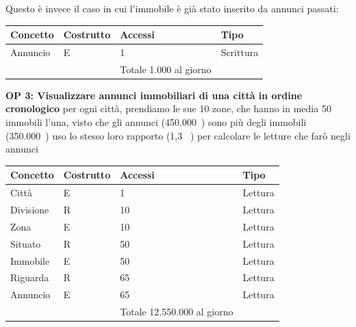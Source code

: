\documentclass[a4paper,12pt]{report}
\begin{document}
            Questo è invece il caso in cui l'immobile è già stato inserito da annunci passati:
            
        	\begin{table}[H]
            \centering
             \begin{tabular}{||l l l l||}
             \hline
             Concetto & Costrutto & Accessi & Tipo \\ [0.5ex] 
             \hline\hline
             Annuncio & E & 1 & Scrittura \\ 
             \hline
                &   & Totale  1.000 al giorno &  \\ [1ex] 
             \hline
             \end{tabular}
            \end{table}

            \textbf{OP 3: Visualizzare annunci immobiliari di una città in ordine cronologico}
            per ogni città, prendiamo le sue 10 zone, che hanno in media 50 immobili l'una, visto che gli annunci (450.000~) sono più degli immobili (350.000~) uso lo stesso loro rapporto (1,3 ~) per calcolare le letture che farò negli annunci
        	\begin{table}[H]
            \centering
             \begin{tabular}{||l l l l||}
             \hline
             Concetto & Costrutto & Accessi & Tipo \\ [0.5ex] 
             \hline\hline
             Città & E & 1 & Lettura \\ 
             Divisione & R & 10 & Lettura \\ 
             Zona & E & 10 & Lettura \\ 
             Situato & R & 50 & Lettura \\ 
             Immobile & E & 50 & Lettura \\ 
             Riguarda & R & 65 & Lettura \\ 
             Annuncio & E & 65 & Lettura \\ 
             \hline
                &   & Totale  12.550.000 al giorno &  \\ [1ex] 
             \hline
             \end{tabular}
            \end{table}
\end{document}
